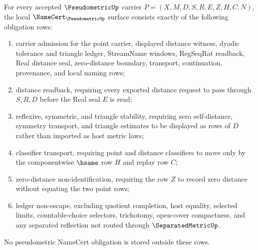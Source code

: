 \begin{theorem}
\label{thm:pseudometric-namecert-obligations}
For every accepted $\PseudometricUp$ carrier $P=(X,M,D,S,R,E,Z,H,C,N)$, the local $\NameCert_{\PseudometricUp}$ surface consists exactly of the following obligation rows:
\begin{enumerate}
\item carrier admission for the point carrier, displayed distance witness, dyadic tolerance and triangle ledger, StreamName windows, RegSeqRat readback, Real distance seal, zero-distance boundary, transport, continuation, provenance, and local naming rows;
\item distance readback, requiring every exported distance request to pass through $S,R,D$ before the Real seal $E$ is read;
\item reflexive, symmetric, and triangle stability, requiring zero self-distance, symmetry transport, and triangle estimates to be displayed as rows of $D$ rather than imported as host metric laws;
\item classifier transport, requiring point and distance classifiers to move only by the componentwise $\hsame$ row $H$ and replay row $C$;
\item zero-distance non-identification, requiring the row $Z$ to record zero distance without equating the two point rows;
\item ledger non-escape, excluding quotient completion, host equality, selected limits, countable-choice selectors, trichotomy, open-cover compactness, and any separated reflection not routed through $\SeparatedMetricUp$.
\end{enumerate}
No pseudometric NameCert obligation is stored outside these rows.
\end{theorem}
